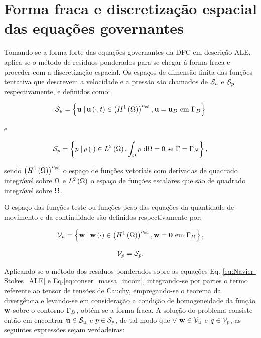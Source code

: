 \documentclass[tese_patricia]{subfiles}%
\begin{document}
\section{Forma fraca e discretização espacial das equações governantes} \label{capitulo:Cap2:FormaFraca}

Tomando-se a forma forte das equações governantes da DFC em descrição ALE, aplica-se o método de resíduos ponderados para se chegar à forma fraca e proceder com a discretização espacial. Os espaços de dimensão finita das funções tentativa que descrevem a velocidade e a pressão são chamados de $\mathcal{S}_u$ e $\mathcal{S}_p$ respectivamente, e definidos como:

\begin{align}
\mathcal{S}_u = \left\{\mathbf{u} \left . \right| \mathbf{u} \left(\cdot,t\right) \in \left(H^{1}\left(\Omega\right)\right)^{{n_{\mathrm{sd}}}}, \mathbf{u} = \mathbf{u}_D \ \textrm {em} \ \Gamma_{D} \right\}
\end{align}

\noindent e

\begin{align}
\mathcal{S}_p = \left\{p \left . \right| p \left(\cdot\right) \in L^{2}\left(\Omega\right), \int_{\Omega}p \textrm { } \mathrm{d} \Omega = 0 \textrm { se } \Gamma = \Gamma_{N} \right\},
\end{align}

\noindent sendo $\left(H^{1}\left(\Omega\right)\right)^{{n_{\mathrm{sd}}}}$ o espaço de funções vetoriais com derivadas de quadrado integrável sobre $\Omega$ e $L^{2}\left(\Omega\right)$ o espaço de funções escalares que são de quadrado integrável sobre $\Omega$.

O espaço das funções teste ou funções peso das equações da quantidade de movimento e da continuidade são definidos respectivamente por:

\begin{align}
\mathcal{V}_u = \left\{\mathbf{w} \left . \right| \mathbf{w} \left(\cdot\right) \in \left(H^{1}\left(\Omega\right)\right)^{{n_{\mathrm{sd}}}}, \mathbf{w} = \mathbf{0} \textrm { em} \ \Gamma_{D} \right\},
\end{align}


\begin{align}
\mathcal{V}_p = \mathcal{S}_p.
\end{align}

Aplicando-se o método dos resíduos ponderados sobre as equações Eq. \eqref{eq:Navier-Stokes_ALE} e Eq.\eqref{eq:conser_massa_incom}, integrando-se por partes o termo referente ao tensor de tensões de Cauchy, empregando-se o teorema da divergência e levando-se em consideração a condição de homogeneidade da função $\mathbf{w}$ sobre o contorno $\Gamma_{D}$, obtém-se a forma fraca. A solução do problema consiste então em encontrar $\mathbf{u} \in \mathcal{S}_u$ e $p \in \mathcal{S}_p$, de tal modo que $\forall$ $\mathbf{w} \in \mathcal{V}_u$ e $q \in \mathcal{V}_p$, as seguintes expressões sejam verdadeiras:
\end{document}
